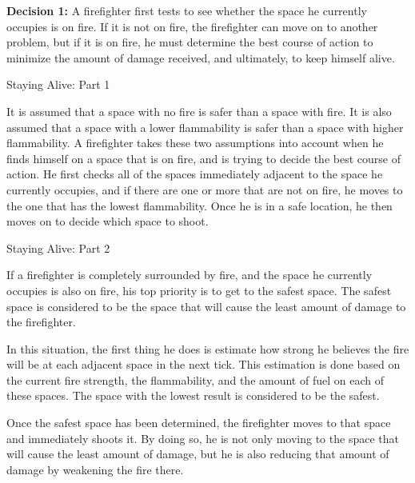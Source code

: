 \documentclass{article}
\begin{document}
  \begin{description}
  \item \textbf{Decision 1:}
    A firefighter first tests to see whether the space he currently  occupies is on
    fire. If it is not on fire, the firefighter can move on to another
    problem, but if it is on fire, he must determine the best course of
    action to minimize the amount of damage received, and ultimately, to keep
    himself alive.

    \begin{description}

    \item{Staying Alive: Part 1}

        It is assumed that a space with no fire is safer than a space
        with fire. It is also assumed that a space with a lower flammability
        is safer than a space with higher flammability. A firefighter takes these
        two assumptions into account when he finds himself on a space that is
        on fire, and is trying to decide the best course of action.  He first
        checks all of the spaces immediately adjacent to the space he currently
        occupies, and if there are one or more that are not on fire, he moves
        to the one that has the lowest flammability.  Once he is in a safe
        location, he then moves on to decide which space to shoot.

    \item{Staying Alive: Part 2}

        If a firefighter is completely surrounded by fire, and the space he
        currently occupies is also on fire, his top priority is to get to the
        safest space.  The safest space is considered to be the space that will
        cause the least amount of damage to the firefighter.

        In this situation, the first thing he does is estimate how strong he
        believes the fire will be at each adjacent space in the next tick.
        This estimation is done based on the current fire strength, the
        flammability, and the amount of fuel on each of these spaces.  The
        space with the lowest result is considered to be the safest.

        Once the safest space has been determined, the firefighter moves to
        that space and immediately shoots it.  By doing so, he is not only
        moving to the space that will cause the least amount of damage, but
        he is also reducing that amount of damage by weakening the fire there.


\end{description}
\end{description}
\end{document}
